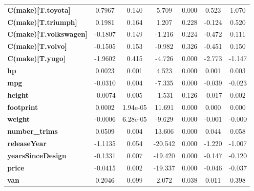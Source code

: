 \begin{center}
\begin{tabular}{lcccccc}
\textbf{C(make)[T.toyota]}        &       0.7967  &        0.140     &     5.709  &         0.000        &        0.523    &        1.070     \\
\textbf{C(make)[T.triumph]}       &       0.1981  &        0.164     &     1.207  &         0.228        &       -0.124    &        0.520     \\
\textbf{C(make)[T.volkswagen]}    &      -0.1807  &        0.149     &    -1.216  &         0.224        &       -0.472    &        0.111     \\
\textbf{C(make)[T.volvo]}         &      -0.1505  &        0.153     &    -0.982  &         0.326        &       -0.451    &        0.150     \\
\textbf{C(make)[T.yugo]}          &      -1.9602  &        0.415     &    -4.726  &         0.000        &       -2.773    &       -1.147     \\
\textbf{hp}                       &       0.0023  &        0.001     &     4.523  &         0.000        &        0.001    &        0.003     \\
\textbf{mpg}                      &      -0.0310  &        0.004     &    -7.335  &         0.000        &       -0.039    &       -0.023     \\
\textbf{height}                   &      -0.0074  &        0.005     &    -1.531  &         0.126        &       -0.017    &        0.002     \\
\textbf{footprint}                &       0.0002  &     1.94e-05     &    11.691  &         0.000        &        0.000    &        0.000     \\
\textbf{weight}                   &      -0.0006  &     6.28e-05     &    -9.629  &         0.000        &       -0.001    &       -0.000     \\
\textbf{number\_trims}            &       0.0509  &        0.004     &    13.606  &         0.000        &        0.044    &        0.058     \\
\textbf{releaseYear}              &      -1.1135  &        0.054     &   -20.542  &         0.000        &       -1.220    &       -1.007     \\
\textbf{yearsSinceDesign}         &      -0.1331  &        0.007     &   -19.420  &         0.000        &       -0.147    &       -0.120     \\
\textbf{price}                    &      -0.0415  &        0.002     &   -19.337  &         0.000        &       -0.046    &       -0.037     \\
\textbf{van}                      &       0.2046  &        0.099     &     2.072  &         0.038        &        0.011    &        0.398     \\

\end{tabular}
\end{center}
